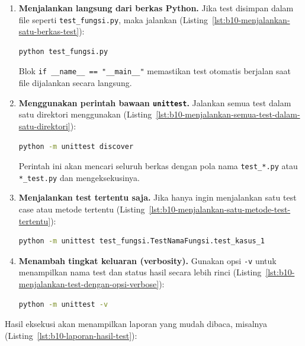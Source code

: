 \begin{enumerate}
    \item \textbf{Menjalankan langsung dari berkas Python.}  
    Jika test disimpan dalam file seperti \texttt{test\_fungsi.py}, maka jalankan (Listing~\ref{lst:b10-menjalankan-satu-berkas-test}):
\begin{lstlisting}[language=bash, caption={Menjalankan satu berkas test}, label={lst:b10-menjalankan-satu-berkas-test}]
python test_fungsi.py
\end{lstlisting}
    Blok \texttt{if \_\_name\_\_ == "\_\_main\_\_"} memastikan test otomatis berjalan saat file dijalankan secara langsung.

    \item \textbf{Menggunakan perintah bawaan \texttt{unittest}.}  
    Jalankan semua test dalam satu direktori menggunakan (Listing~\ref{lst:b10-menjalankan-semua-test-dalam-satu-direktori}):
\begin{lstlisting}[language=bash, caption={Menjalankan semua test dalam satu direktori}, label={lst:b10-menjalankan-semua-test-dalam-satu-direktori}]
python -m unittest discover
\end{lstlisting}
    Perintah ini akan mencari seluruh berkas dengan pola nama \texttt{test\_*.py} atau \texttt{*\_test.py} dan mengeksekusinya.

    \item \textbf{Menjalankan test tertentu saja.}  
    Jika hanya ingin menjalankan satu test case atau metode tertentu (Listing~\ref{lst:b10-menjalankan-satu-metode-test-tertentu}):
\begin{lstlisting}[language=bash, caption={Menjalankan satu metode test tertentu}, label={lst:b10-menjalankan-satu-metode-test-tertentu}]
python -m unittest test_fungsi.TestNamaFungsi.test_kasus_1
\end{lstlisting}

    \item \textbf{Menambah tingkat keluaran (verbosity).}  
    Gunakan opsi \texttt{-v} untuk menampilkan nama test dan status hasil secara lebih rinci (Listing~\ref{lst:b10-menjalankan-test-dengan-opsi-verbose}):
\begin{lstlisting}[language=bash, caption={Menjalankan test dengan opsi verbose}, label={lst:b10-menjalankan-test-dengan-opsi-verbose}]
python -m unittest -v
\end{lstlisting}
\end{enumerate}

Hasil eksekusi akan menampilkan laporan yang mudah dibaca, misalnya (Listing~\ref{lst:b10-laporan-hasil-test}):

